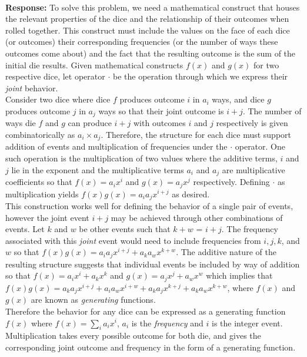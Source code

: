 \documentclass{article}
\newcommand{\response}[1]{\leavevmode\\[0.05in]{\bf Response: } #1 \leavevmode\\[0.05in]}
\begin{document}
\response{To solve this problem, we need a mathematical construct that houses the relevant properties of the dice and the relationship of their outcomes when rolled together. This construct must include the values on the face of each dice (or outcomes) their corresponding frequencies (or the number of ways these outcomes come about) and the fact that the resulting outcome is the sum of the initial die results. Given mathematical constructs $f(x)$ and $g(x)$ for two respective dice, let operator $\cdot$  be the operation through which we express their {\it joint} behavior. \\[0.05in]
Consider two dice where dice $f$ produces outcome $i$ in $a_i$ ways, and dice $g$ produces outcome $j$ in $a_j$ ways so that their joint outcome is $i + j$. The number of ways die $f$ and $g$ can produce $i + j$ with outcomes $i$ and $j$ respectively is given combinatorically as $a_i \times a_j$. Therefore, the structure for each dice must support addition of events and multiplication of frequencies under the $\cdot$ operator. One such operation is the multiplication of two values where the additive terms, $i$ and $j$ lie in the exponent and the multiplicative terms $a_i$ and $a_j$ are multiplicative coefficients so that $f(x) = a_ix^i$ and $g(x) = a_jx^j$ respectively. Defining $\cdot$ as multiplication yields $f(x)g(x) = a_ia_jx^{i + j}$ as desired. \\[0.05in]
This construction works well for defining the behavior of a single pair of events, however the joint event $i + j$ may be achieved through other combinations of events.  Let $k$ and $w$ be other events such that $k + w$ = $i + j$. The frequency associated with this {\it joint} event would need to include frequencies from $i,j,k$, and $w$ so that $f(x)g(x) = a_ia_jx^{i + j} + a_ka_wx^{k + w}$. The additive nature of the resulting structure suggests that individual events be included by way of addition so that $f(x) = a_ix^i + a_kx^k$ and $g(x) = a_jx^j + a_wx^w$ which implies that $f(x)g(x) = a_ka_jx^{i+j} + a_ia_wx^{i+w} + a_ka_jx^{k+j} + a_ka_wx^{k+w}$, where $f(x)$ and $g(x)$ are known as {\it generating} functions. \\[0.05in]
Therefore the behavior for any dice can be expressed as a generating function $f(x)$ where $f(x) = \sum_ia_ix^i$, $a_i$ is the {\it frequency} and $i$ is the integer event. Multiplication takes every possible outcome for both die, and gives the corresponding joint outcome and frequency in the form of a generating function.\\[0.05in] 
} 
\end{document}
